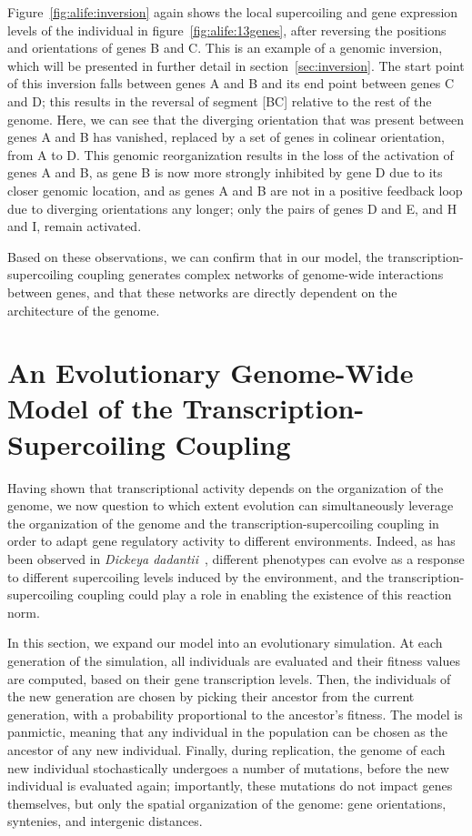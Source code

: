 Figure~\ref{fig:alife:inversion} again shows the local supercoiling and gene expression levels of the individual in figure~\ref{fig:alife:13genes}, after reversing the positions and orientations of genes B and C.
This is an example of a genomic inversion, which will be presented in further detail in section~\ref{sec:inversion}.
The start point of this inversion falls between genes A and B and its end point between genes C and D; this results in the reversal of segment [BC] relative to the rest of the genome.
Here, we can see that the diverging orientation that was present between genes A and B has vanished, replaced by a set of genes in colinear orientation, from A to D.
This genomic reorganization results in the loss of the activation of genes A and B, as gene B is now more strongly inhibited by gene D due to its closer genomic location, and as genes A and B are not in a positive feedback loop due to diverging orientations any longer; only the pairs of genes D and E, and H and I, remain activated.

Based on these observations, we can confirm that in our model, the transcription-supercoiling coupling generates complex networks of genome-wide interactions between genes, and that these networks are directly dependent on the architecture of the genome.


\section{An Evolutionary Genome-Wide Model of the Transcription- Supercoiling Coupling}
\label{sec:alife:evol_model}

Having shown that transcriptional activity depends on the organization of the genome, we now question to which extent evolution can simultaneously leverage the organization of the genome and the transcription-supercoiling coupling in order to adapt gene regulatory activity to different environments.
Indeed, as has been observed in \emph{Dickeya dadantii}~\citep{muskhelishvili2019}, different phenotypes can evolve as a response to different supercoiling levels induced by the environment, and the transcription-supercoiling coupling could play a role in enabling the existence of this reaction norm.

In this section, we expand our model into an evolutionary simulation.
At each generation of the simulation, all individuals are evaluated and their fitness values are computed, based on their gene transcription levels.
Then, the individuals of the new generation are chosen by picking their ancestor from the current generation, with a probability proportional to the ancestor's fitness.
The model is panmictic, meaning that any individual in the population can be chosen as the ancestor of any new individual.
Finally, during replication, the genome of each new individual stochastically undergoes a number of mutations, before the new individual is evaluated again; importantly, these mutations do not impact genes themselves, but only the spatial organization of the genome: gene orientations, syntenies, and intergenic distances.


